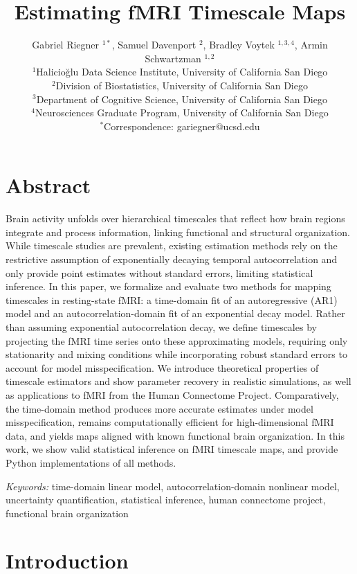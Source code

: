 \documentclass[9pt]{article}
\title{Estimating fMRI Timescale Maps}
\author{Gabriel Riegner $^{1\ast}$, Samuel Davenport $^{2}$, Bradley Voytek $^{1,3,4}$, Armin Schwartzman $^{1,2}$\\
{\small $^{1}$Halicio\u{g}lu Data Science Institute, University of California San Diego}\\
{\small $^{2}$Division of Biostatistics, University of California San Diego}\\
{\small $^{3}$Department of Cognitive Science, University of California San Diego}\\
{\small $^{4}$Neurosciences Graduate Program, University of California San Diego}\\
{\small $^\ast$Correspondence:  gariegner@ucsd.edu}
}
\date{}
\begin{document}
\maketitle

\section*{Abstract}
Brain activity unfolds over hierarchical timescales that reflect how brain regions integrate and process information, linking functional and structural organization. While timescale studies are prevalent, existing estimation methods rely on the restrictive assumption of exponentially decaying temporal autocorrelation and only provide point estimates without standard errors, limiting statistical inference. In this paper, we formalize and evaluate two methods for mapping timescales in resting-state fMRI: a time-domain fit of an autoregressive (AR1) model and an autocorrelation-domain fit of an exponential decay model. Rather than assuming exponential autocorrelation decay, we define timescales by projecting the fMRI time series onto these approximating models, requiring only stationarity and mixing conditions while incorporating robust standard errors to account for model misspecification. We introduce theoretical properties of timescale estimators and show parameter recovery in realistic simulations, as well as applications to fMRI from the Human Connectome Project. Comparatively, the time-domain method produces more accurate estimates under model misspecification, remains computationally efficient for high-dimensional fMRI data, and yields maps aligned with known functional brain organization. In this work, we show valid statistical inference on fMRI timescale maps, and provide Python implementations of all methods.

\vfill
\noindent\textit{Keywords:} time-domain linear model, autocorrelation-domain nonlinear model, uncertainty quantification, statistical inference, human connectome project, functional brain organization
\thispagestyle{empty}
\newpage
\setcounter{page}{1}

\section{Introduction}
\end{document}
